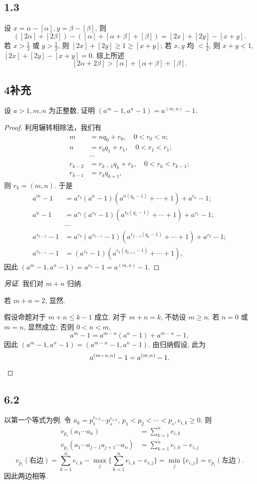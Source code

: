 \documentclass[12pt,a4paper,reqno]{amsart}
\theoremstyle{remark}
\renewcommand{\le}{\leqslant}
\renewcommand{\ge}{\geqslant}
\begin{document}
\subsection*{1.3}
设 $x=\alpha-[\alpha],y=\beta-[\beta]$, 则
  \[([2\alpha]+[2\beta])-([\alpha]+[\alpha+\beta]+[\beta])=[2x]+[2y]-[x+y].\]
若 $x>\frac{1}{2}$ 或 $y>\frac{1}{2}$, 则 $[2x]+[2y]\geqslant 1\geqslant [x+y]$; 若 $x,y$ 均 $<\frac{1}{2}$, 则 $x+y<1$, $[2x]+[2y]-[x+y]=0$. 综上所述
  \[[2\alpha+2\beta]>[\alpha]+[\alpha+\beta]+[\beta].\]

\subsection*{4补充}
设 $a>1,m,n$ 为正整数, 证明 $(a^m-1,a^n-1)=a^{(m,n)}-1.$
\begin{proof}
利用辗转相除法，我们有
  \[\begin{split}
          m&=n q_0+r_0,\quad 0<r_0<n;\\
          n&=r_0q_1+r_1,\quad 0<r_1<r_1;\\
           &\cdots\\
    r_{k-2}&=r_{k-1}q_k+r_k,\quad 0<r_k<r_{k-1};\\
    r_{k-1}&=r_k q_{k+1},
  \end{split}\]
则 $r_k=(m,n)$. 于是
  \[\begin{split}
            a^m-1&=a^{r_0}(a^n-1)(a^{n(q_0-1)}+\cdots+1)+a^{r_0}-1;\\
            a^n-1&=a^{r_1}(a^{r_0}-1)(a^{r_0(q_1-1)}+\cdots+1)+a^{r_1}-1;\\
                 &\cdots\\
    a^{r_{k-2}}-1&=a^{r_k}(a^{r_{k-1}}-1)(a^{r_{k-1}(q_k-1)}+\cdots+1)+a^{r_k}-1;\\
    a^{r_{k-1}}-1&=(a^{r_k}-1)(a^{r_k(q_{k+1}-1)}+\cdots+1),
  \end{split}\]
因此 $(a^m-1,a^n-1)=a^{r_k}-1=a^{(m,n)}-1$.
\end{proof}
\begin{proof}[另证]
我们对 $m+n$ 归纳.

若 $m+n=2$, 显然.

假设命题对于 $m+n\le k-1$ 成立. 对于 $m+n=k$, 不妨设 $m\geqslant n$. 若 $n=0$ 或 $m=n$, 显然成立; 否则 $0<n<m$,
  \[a^m-1=a^{m-n}(a^n-1)+a^{m-n}-1,\]
因此 $(a^m-1,a^n-1)=(a^{m-n}-1,a^n-1)$. 由归纳假设, 此为
  \[a^{(m-n,n)}-1=a^{(m,n)}-1.\qedhere\]
\end{proof}

\subsection*{6.2}
以第一个等式为例. 令 $a_k=p_1^{e_{1,k}}\cdots p_s^{e_{s,k}}$, $p_1<p_2<\cdots<p_s, e_{i,k}\ge 0$. 则
  \[\begin{split}
    v_{p_i}(a_1\cdots a_n)&=\sum_{k=1}^n e_{i,k}\\
    v_{p_i}(a_1\cdots a_{j-1}a_{j+1}\cdots a_n)& =\sum_{k=1}^n e_{i,k}-e_{i,j}
  \end{split}\]
  \[
     v_{p_i}(\text{右边})
    =\sum_{k=1}^n e_{i,k}-\max_j \{\sum_{k=1}^n e_{i,k}-e_{i,j}\}
    =\min_j \{e_{i,j}\}=v_{p_i}(\text{左边}).
  \]
因此两边相等.
\end{document}
